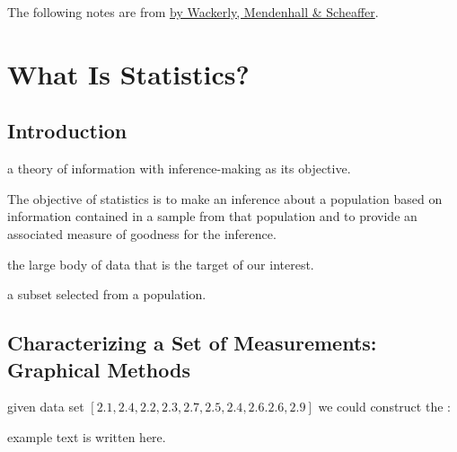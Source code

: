 The following notes are from \href{https://www.isbns.fm/isbn/9780495110811/}{ by Wackerly, Mendenhall \& Scheaffer}.

\section{What Is Statistics?}

\subsection{Introduction}

\begin{defn}
    a theory of information with inference-making as its objective.
\end{defn}

\begin{rmrk}
    The objective of statistics is to make an inference about a population based on information contained in a sample from that population and to provide an associated measure of goodness for the inference.
\end{rmrk}

\begin{defn}
    the large body of data that is the target of our interest.
\end{defn}

\begin{defn}
    a subset selected from a population.
\end{defn}

\subsection{Characterizing a Set of Measurements: Graphical Methods}

\begin{exmp}
    given data set $[2.1,2.4,2.2,2.3,2.7,2.5,2.4,2.6.2.6,2.9]$ we could construct the :
\end{exmp}

\begin{figure}[h]
    \centering
     
\end{figure}

\begin{exmp}
example text is written here.
\end{exmp}